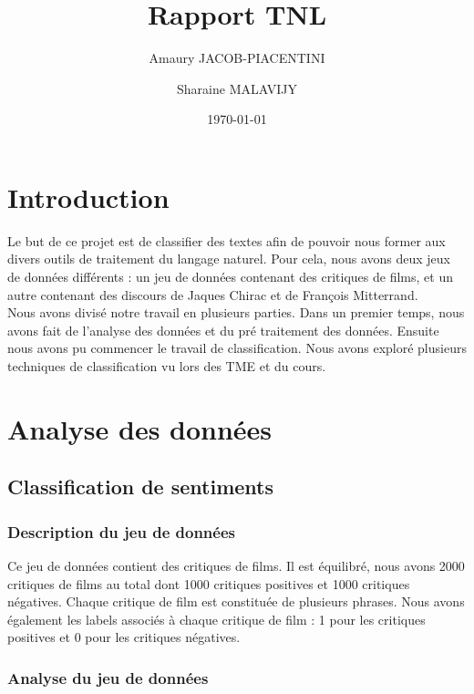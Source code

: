 \documentclass{article}
\begin{document}
\title{Rapport TNL}
\author{Amaury JACOB-PIACENTINI
\and Sharaine MALAVIJY}
\date{\today}

\maketitle

\tableofcontents
\newpage


\section{Introduction}

Le but de ce projet est de classifier des textes afin de pouvoir nous former aux divers outils de traitement du langage naturel. Pour cela, nous avons deux jeux de données différents : un jeu de données contenant des critiques de films, et un autre contenant des discours de Jaques Chirac et de François Mitterrand.\\
Nous avons divisé notre travail en plusieurs parties. Dans un premier temps, nous avons fait de l'analyse des données et du pré traitement des données. Ensuite nous avons pu commencer le travail de classification. Nous avons exploré plusieurs techniques de classification vu lors des TME et du cours.


\section{Analyse des données}
\subsection{Classification de sentiments}

\subsubsection{Description du jeu de données}

Ce jeu de données contient des critiques de films. Il est équilibré, nous avons 2000 critiques de films au total dont 1000 critiques positives et 1000 critiques négatives. Chaque critique de film est constituée de plusieurs phrases. Nous avons également les labels associés à chaque critique de film : 1 pour les critiques positives et 0 pour les critiques négatives.

\subsubsection{Analyse du jeu de données}
\end{document}
